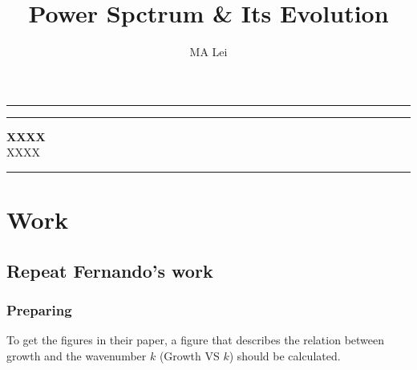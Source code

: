 \documentclass{article}
\begin{document}
\title{Power Spctrum \& Its Evolution}
\author{MA Lei}
\maketitle





\newpage    %
\hrule\vspace{1pt}\hrule
\begin{center}
\mbox{{\bf XXXX}} \\
\vspace{0.5em}
\mbox{{XXXX}}
\end{center}
\hrule



\section{Work}

\subsection{Repeat Fernando's work}

\subsubsection{Preparing}

To get the figures in their paper, a figure that describes the relation between growth and the wavenumber $k$ (Growth VS $k$) should be calculated.
\end{document}
